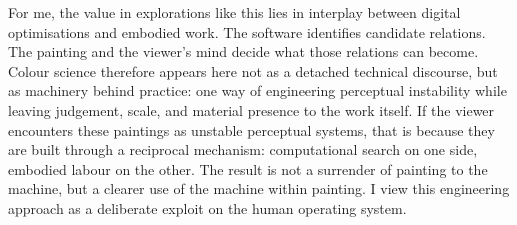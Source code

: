 \documentclass[11pt]{article}
\begin{document}
For me, the value in explorations like this lies in interplay between digital optimisations and embodied work. The software identifies candidate relations. The painting and the viewer's mind decide what those relations can become. Colour science therefore appears here not as a detached technical discourse, but as machinery behind practice: one way of engineering perceptual instability while leaving judgement, scale, and material presence to the work itself. If the viewer encounters these paintings as unstable perceptual systems, that is because they are built through a reciprocal mechanism: computational search on one side, embodied labour on the other. The result is not a surrender of painting to the machine, but a clearer use of the machine within painting. I view this engineering approach as a deliberate exploit on the human operating system.

\printbibliography
\end{document}

